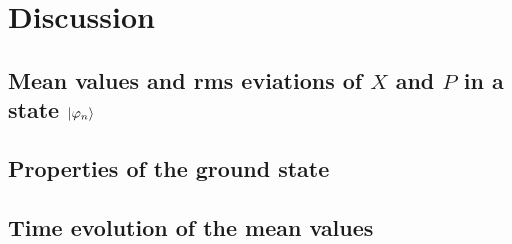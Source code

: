 \section{Discussion}


\subsection{Mean values and rms eviations of $X$ and $P$ in a state $|\varphi_n\rangle$}


\subsection{Properties of the ground state}



\subsection{Time evolution of the mean values}


